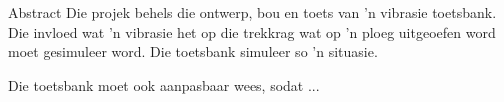 
\begin{Summary}{Abstract}
	Die projek behels die ontwerp, bou en toets van 'n vibrasie
	toetsbank. Die invloed wat 'n vibrasie het op die trekkrag wat op
	'n ploeg uitgeoefen word moet gesimuleer word. Die toetsbank
	simuleer so 'n situasie.
	
	Die toetsbank moet ook aanpasbaar wees, sodat ...
\end{Summary}

\endinput
